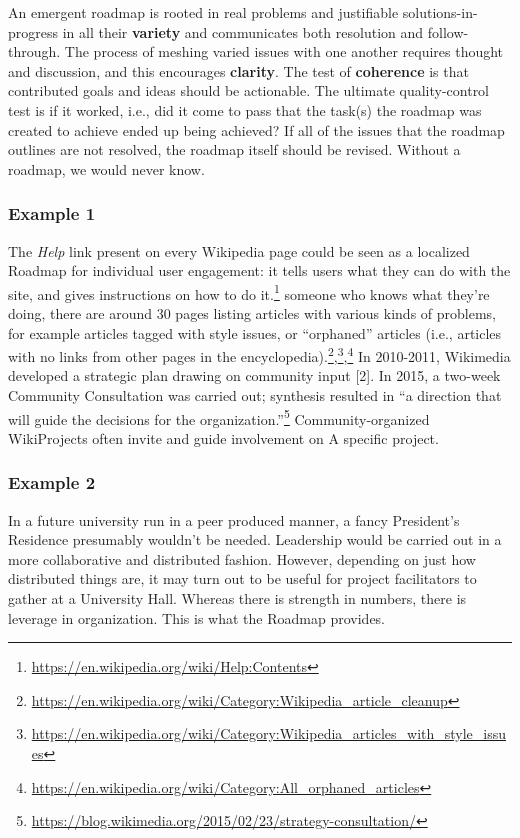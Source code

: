An emergent roadmap is rooted in real problems and justifiable
solutions-in-progress in all their \textbf{variety} and communicates
both resolution and follow-through. The process of meshing varied issues
with one another requires thought and discussion, and this encourages
\textbf{clarity}. The test of \textbf{coherence} is that contributed
goals and ideas should be actionable. The ultimate quality-control test
is if it worked, i.e., did it come to pass that the task(s) the roadmap
was created to achieve ended up being achieved? If all of the issues
that the roadmap outlines are not resolved, the roadmap itself should be
revised. Without a roadmap, we would never know.

\hypertarget{example-1}{%
\subsubsection{Example 1}\label{example-1}}

The \emph{Help} link present on every Wikipedia page could be seen as a
localized {{Roadmap}} for individual user engagement: it tells users
what they can do with the site, and gives instructions on how to do
it.\footnote{\url{https://en.wikipedia.org/wiki/Help:Contents}} someone
who knows what they're doing, there are around 30 pages listing articles
with various kinds of problems, for example articles tagged with style
issues, or ``orphaned'' articles (i.e., articles with no links from
other pages in the encyclopedia).\footnote{\url{https://en.wikipedia.org/wiki/Category:Wikipedia_article_cleanup}},\footnote{\url{https://en.wikipedia.org/wiki/Category:Wikipedia_articles_with_style_issues}},\footnote{\url{https://en.wikipedia.org/wiki/Category:All_orphaned_articles}}
In 2010-2011, Wikimedia developed a strategic plan drawing on community
input {{[}2{]}}. In 2015, a two-week Community Consultation was carried
out; synthesis resulted in ``a direction that will guide the decisions
for the organization.''\footnote{\url{https://blog.wikimedia.org/2015/02/23/strategy-consultation/}}
Community-organized WikiProjects often invite and guide involvement on
{{A specific project}}.

\hypertarget{example-2}{%
\subsubsection{Example 2}\label{example-2}}

In a future university run in a peer produced manner, a fancy
President's Residence presumably wouldn't be needed. Leadership would be
carried out in a more collaborative and distributed fashion. However,
depending on just how distributed things are, it may turn out to be
useful for project facilitators to gather at a University Hall. Whereas
there is strength in numbers, there is leverage in organization. This is
what the {{Roadmap}} provides.

